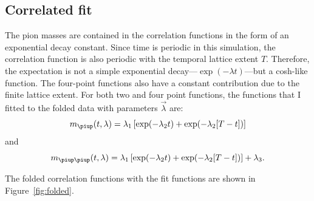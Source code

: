 \documentclass[11pt, english, fleqn, DIV=15, headinclude]{scrartcl}
\begin{document}
\subsection{Correlated fit}
\label{sec:correlated_fit}

The pion masses are contained in the correlation functions in the form of an
exponential decay constant. Since time is periodic in this simulation, the
correlation function is also periodic with the temporal lattice extent $T$.
Therefore, the expectation is not a simple exponential decay—$\exp(-\lambda
t)$—but a cosh-like function. The four-point functions also have a constant
contribution due to the finite lattice extent. For both two and four point
functions, the functions that I fitted to the folded data with parameters $\vec
\lambda$ are:
\begin{equation}
    \label{eq:fit2}
    m_\piup(t, \lambda) = \lambda_1 \sbr{\exp(-\lambda_2 t) + \exp(-\lambda_2
    [T - t])}
\end{equation}
and
\begin{equation}
    \label{eq:fit4}
    m_{\piup\piup}(t, \lambda) = \lambda_1 \sbr{\exp(-\lambda_2 t) + \exp(-\lambda_2
    [T - t])} + \lambda_3.
\end{equation}

The folded correlation functions with the fit functions are shown in
Figure~\ref{fig:folded}.
\end{document}
